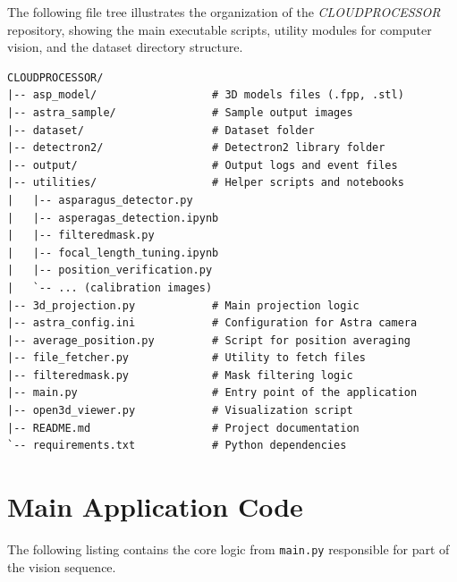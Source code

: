 The following file tree illustrates the organization of the \textit{CLOUDPROCESSOR} repository, showing the main executable scripts, utility modules for computer vision, and the dataset directory structure.

\begin{verbatim}
CLOUDPROCESSOR/
|-- asp_model/                  # 3D models files (.fpp, .stl)
|-- astra_sample/               # Sample output images
|-- dataset/                    # Dataset folder
|-- detectron2/                 # Detectron2 library folder
|-- output/                     # Output logs and event files
|-- utilities/                  # Helper scripts and notebooks
|   |-- asparagus_detector.py
|   |-- asperagas_detection.ipynb
|   |-- filteredmask.py
|   |-- focal_length_tuning.ipynb
|   |-- position_verification.py
|   `-- ... (calibration images)
|-- 3d_projection.py            # Main projection logic
|-- astra_config.ini            # Configuration for Astra camera
|-- average_position.py         # Script for position averaging
|-- file_fetcher.py             # Utility to fetch files
|-- filteredmask.py             # Mask filtering logic
|-- main.py                     # Entry point of the application
|-- open3d_viewer.py            # Visualization script
|-- README.md                   # Project documentation
`-- requirements.txt            # Python dependencies
\end{verbatim}

\section{Main Application Code}

The following listing contains the core logic from \texttt{main.py} responsible for  part of the vision  sequence.

